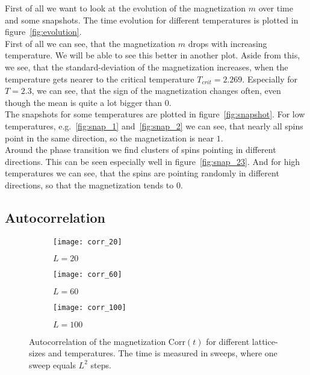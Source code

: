 First of all we want to look at the evolution of the magnetization $m$ over time and some snapshots. The time evolution for different temperatures is plotted in figure~\ref{fig:evolution}.\\
First of all we can see, that the magnetization $m$ drops with increasing temperature. We will be able to see this better in another plot. Aside from this, we see, that the standard-deviation of the magnetization increases, when the temperature gets nearer to the critical temperature $T_{crit} = 2.269$. Especially for $T = 2.3$, we can see, that the sign of the magnetization changes often, even though the mean is quite a lot bigger than $0$.\\
The snapshots for some temperatures are plotted in figure~\ref{fig:snapshot}. For low temperatures, e.g.~\ref{fig:snap_1} and~\ref{fig:snap_2} we can see, that nearly all spins point in the same direction, so the magnetization is near $1$.\\
Around the phase transition we find clusters of spins pointing in different directions. This can be seen especially well in figure~\ref{fig:snap_23}. And for high temperatures we can see, that the spins are pointing randomly in different directions, so that the magnetization tends to $0$.


\subsection{Autocorrelation}

\begin{figure}
  \begin{subfigure}{0.33\textwidth}
    \centering
    \texttt{[image: corr\_20]}
    \caption{$L = 20$}\label{fig:corr_20}
  \end{subfigure}%
  \begin{subfigure}{0.33\textwidth}
    \centering
    \texttt{[image: corr\_60]}
    \caption{$L = 60$}\label{fig:corr_60}
  \end{subfigure}%
  \begin{subfigure}{0.33\textwidth}
    \centering
    \texttt{[image: corr\_100]}
    \caption{$L = 100$}\label{fig:corr_100}
  \end{subfigure}%
  \caption{Autocorrelation of the magnetization Corr$(t)$ for different lattice-sizes and temperatures. The time is measured in sweeps, where one sweep equals $L^2$ steps.}\label{fig:corr}
\end{figure}

